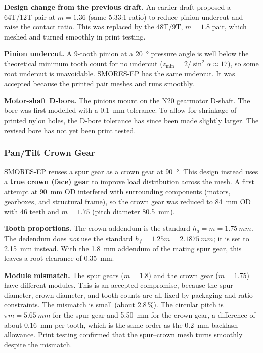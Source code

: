 \documentclass[12pt,a4paper]{article}
\begin{document}
\textbf{Design change from the previous draft.} An earlier draft proposed a
64T/12T pair at $m = 1.36$ (same 5.33:1 ratio) to reduce pinion undercut and
raise the contact ratio. This was replaced by the 48T/9T, $m = 1.8$ pair, which
meshed and turned smoothly in print testing.

\textbf{Pinion undercut.} A 9-tooth pinion at a \SI{20}{\degree} pressure angle is
well below the theoretical minimum tooth count for no undercut
($z_{\min} = 2/\sin^2\alpha \approx 17$), so some root undercut is unavoidable.
SMORES-EP has the same undercut. It was accepted because the printed pair meshes
and runs smoothly.

\textbf{Motor-shaft D-bore.} The pinions mount on the N20 gearmotor D-shaft.
The bore was first modelled with a \SI{0.1}{mm} tolerance. To allow for
shrinkage of printed nylon holes, the D-bore tolerance has since been made
slightly larger. The revised bore has not yet been print tested.

\subsubsection{Pan/Tilt Crown Gear}

SMORES-EP reuses a spur gear as a crown gear at \SI{90}{\degree}. This design
instead uses a \textbf{true crown (face) gear} to improve load distribution
across the mesh. A first attempt at \SI{90}{mm} OD interfered with surrounding
components (motors, gearboxes, and structural frame), so the crown gear was
reduced to \SI{84}{mm} OD with 46 teeth and $m = 1.75$ (pitch diameter
\SI{80.5}{mm}).

\textbf{Tooth proportions.} The crown addendum is the standard
$h_a = m = \SI{1.75}{mm}$. The dedendum does \emph{not} use the standard
$h_f = 1.25m = \SI{2.1875}{mm}$; it is set to \SI{2.15}{mm} instead. With the
\SI{1.8}{mm} addendum of the mating spur gear, this leaves a root clearance of
\SI{0.35}{mm}.

\textbf{Module mismatch.} The spur gears ($m = 1.8$) and the crown gear
($m = 1.75$) have different modules. This is an accepted compromise, because the
spur diameter, crown diameter, and tooth counts are all fixed by packaging and
ratio constraints. The mismatch is small (about 2.8\,\%). The circular pitch is
$\pi m = \SI{5.65}{mm}$ for the spur gear and \SI{5.50}{mm} for the crown gear,
a difference of about \SI{0.16}{mm} per tooth, which is the same order as the
\SI{0.2}{mm} backlash allowance. Print testing confirmed that the spur--crown
mesh turns smoothly despite the mismatch.
\end{document}
